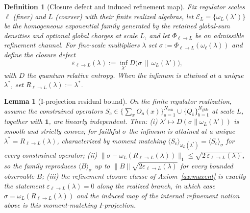 \documentclass[11pt]{article}
\newtheorem{lemma}[theorem]{Lemma}
\newtheorem{definition}[theorem]{Definition}
\begin{document}
\begin{definition}[Closure defect and induced refinement map]\label{def:closure-defect}
Fix regulator scales \(\ell\) (finer) and \(L\) (coarser) with their finite realized algebras, let \(\mathcal E_L=\{\omega_L(\lambda')\}\) be the homogeneous exponential family generated by the retained global-sum densities and optional global charges at scale \(L\), and let \(\Phi_{\ell\to L}\) be an admissible refinement channel. For fine-scale multipliers \(\lambda\) set \(\sigma:=\Phi_{\ell\to L}(\omega_\ell(\lambda))\) and define the \emph{closure defect}
\[
\varepsilon_{\ell\to L}(\lambda):=\inf_{\lambda'} D\bigl(\sigma\,\big\|\,\omega_L(\lambda')\bigr),
\]
with \(D\) the quantum relative entropy. When the infimum is attained at a unique \(\lambda^\ast\), set \(R_{\ell\to L}(\lambda):=\lambda^\ast\).
\end{definition}

\begin{lemma}[I-projection residual bound]\label{lem:closure-residual}
On the finite regulator realization, assume the constrained operators \(S_c\in\{\sum_x O_a(x)\}_{a=1}^{N_{\mathrm{con}}}\cup\{Q_b\}_{b=1}^{N_{\mathrm{glob}}}\) at scale \(L\), together with \(\mathbf 1\), are linearly independent. Then:
(i) \(\lambda'\mapsto D(\sigma\|\omega_L(\lambda'))\) is smooth and strictly convex; for faithful \(\sigma\) the infimum is attained at a unique \(\lambda^\ast=R_{\ell\to L}(\lambda)\), characterized by moment matching \(\langle S_c\rangle_{\omega_L(\lambda^\ast)}=\langle S_c\rangle_\sigma\) for every constrained operator;
(ii) \(\bigl\|\sigma-\omega_L(R_{\ell\to L}(\lambda))\bigr\|_1\le\sqrt{2\,\varepsilon_{\ell\to L}(\lambda)}\), so the family reproduces \(\langle B\rangle_\sigma\) up to \(\|B\|\sqrt{2\varepsilon_{\ell\to L}(\lambda)}\) for every bounded observable \(B\);
(iii) the refinement-closure clause of Axiom~\ref{ax:maxent} is exactly the statement \(\varepsilon_{\ell\to L}(\lambda)=0\) along the realized branch, in which case \(\sigma=\omega_L(R_{\ell\to L}(\lambda))\) and the induced map of the internal refinement notion above is this moment-matching I-projection.
\end{lemma}
\end{document}
